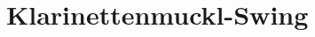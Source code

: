 \section*{Klarinettenmuckl-Swing}
{%
\parindent 0pt
\noindent
\ifx\preLilyPondExample \undefined
\else
  \expandafter\preLilyPondExample
\fi
\def\lilypondbook{}%

\ifx\postLilyPondExample \undefined
\else
  \expandafter\postLilyPondExample
\fi
}
